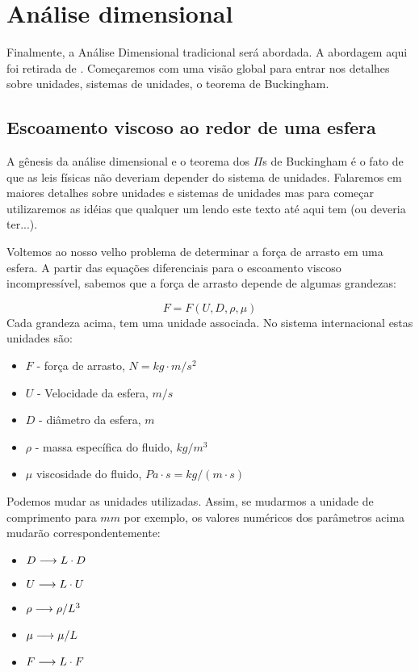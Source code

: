 \section{Análise dimensional}
\label{sec:adim}

Finalmente, a Análise Dimensional tradicional será abordada. A abordagem aqui foi retirada de . Começaremos com  uma visão global para entrar nos detalhes sobre unidades, sistemas de unidades, o teorema de Buckingham.

\subsection{Escoamento viscoso ao redor de uma esfera}

A gênesis da análise dimensional e o teorema dos $\Pi$s de Buckingham é o fato de que as leis físicas não deveriam depender do sistema de unidades. Falaremos em maiores detalhes sobre unidades e sistemas de unidades mas para começar utilizaremos as idéias que qualquer um lendo este texto até aqui tem (ou deveria ter...).

Voltemos ao nosso velho problema de determinar a força de arrasto em uma esfera. A partir das equações diferenciais para o escoamento viscoso incompressível, sabemos que a força de arrasto depende de algumas grandezas:

\[
F = F(U, D, \rho, \mu)
\]
Cada grandeza acima, tem uma unidade associada. No sistema internacional estas unidades são:

\begin{itemize}
\item $F$ - força de arrasto, $N=kg\cdot m/s^2$
\item $U$ - Velocidade da esfera, $m/s$
\item $D$ - diâmetro da esfera, $m$
\item $\rho$ - massa específica do fluido, $kg/m^3$
\item $\mu$ viscosidade do fluido, $Pa\cdot s = kg/(m\cdot s)$
\end{itemize}

Podemos mudar as unidades utilizadas. Assim, se mudarmos a unidade de comprimento para $mm$ por exemplo, os valores numéricos dos parâmetros acima mudarão correspondentemente:

\begin{itemize}
\item $D \longrightarrow L \cdot D$
\item $U \longrightarrow L \cdot U$
\item $\rho \longrightarrow  \rho / L^3$
\item $\mu \longrightarrow \mu / L$
\item $F \longrightarrow L \cdot F$
\end{itemize}

